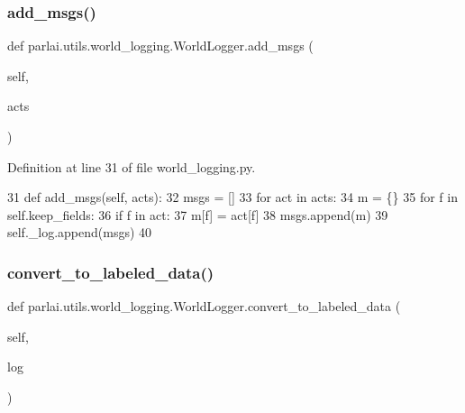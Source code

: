 \subsubsection{\texorpdfstring{add\+\_\+msgs()}{add\_msgs()}}
{\footnotesize\ttfamily def parlai.\+utils.\+world\+\_\+logging.\+World\+Logger.\+add\+\_\+msgs (\begin{DoxyParamCaption}\item[{}]{self,  }\item[{}]{acts }\end{DoxyParamCaption})}



Definition at line 31 of file world\+\_\+logging.\+py.


\begin{DoxyCode}
31     \textcolor{keyword}{def }add\_msgs(self, acts):
32         msgs = []
33         \textcolor{keywordflow}{for} act \textcolor{keywordflow}{in} acts:
34             m = \{\}
35             \textcolor{keywordflow}{for} f \textcolor{keywordflow}{in} self.keep\_fields:
36                 \textcolor{keywordflow}{if} f \textcolor{keywordflow}{in} act:
37                     m[f] = act[f]
38             msgs.append(m)
39         self.\_log.append(msgs)
40 
\end{DoxyCode}
\mbox{\label{classparlai_1_1utils_1_1world__logging_1_1WorldLogger_a712d20e5ace03e3729258b61472c2023}} 
\subsubsection{\texorpdfstring{convert\+\_\+to\+\_\+labeled\+\_\+data()}{convert\_to\_labeled\_data()}}
{\footnotesize\ttfamily def parlai.\+utils.\+world\+\_\+logging.\+World\+Logger.\+convert\+\_\+to\+\_\+labeled\+\_\+data (\begin{DoxyParamCaption}\item[{}]{self,  }\item[{}]{log }\end{DoxyParamCaption})}



